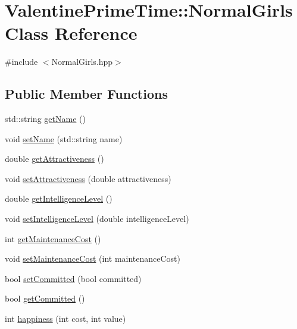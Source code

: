 \hypertarget{classValentinePrimeTime_1_1NormalGirls}{}\section{Valentine\+Prime\+Time\+:\+:Normal\+Girls Class Reference}
\label{classValentinePrimeTime_1_1NormalGirls}


{\ttfamily \#include $<$Normal\+Girls.\+hpp$>$}

\subsection*{Public Member Functions}
\begin{DoxyCompactItemize}
\item 
std\+::string \hyperlink{classValentinePrimeTime_1_1NormalGirls_a3c72692ce62377f36ec6490b85e6442a}{get\+Name} ()
\item 
void \hyperlink{classValentinePrimeTime_1_1NormalGirls_a07672e213efdcaeced5b2d7d81b157d9}{set\+Name} (std\+::string name)
\item 
double \hyperlink{classValentinePrimeTime_1_1NormalGirls_acd0f7ea11b6ef7fe554948fbc846e813}{get\+Attractiveness} ()
\item 
void \hyperlink{classValentinePrimeTime_1_1NormalGirls_ac7aa60395c4f860fc898f8aada2eb21b}{set\+Attractiveness} (double attractiveness)
\item 
double \hyperlink{classValentinePrimeTime_1_1NormalGirls_a66d615a8cecd803f3aadd245524cffd1}{get\+Intelligence\+Level} ()
\item 
void \hyperlink{classValentinePrimeTime_1_1NormalGirls_ae5e7db0b2df483b26878aaf7d9f84861}{set\+Intelligence\+Level} (double intelligence\+Level)
\item 
int \hyperlink{classValentinePrimeTime_1_1NormalGirls_a6fdbb15f962f5d18793eb028825d92e2}{get\+Maintenance\+Cost} ()
\item 
void \hyperlink{classValentinePrimeTime_1_1NormalGirls_a4f2c336e44b0c2ae30df8519a453cdfb}{set\+Maintenance\+Cost} (int maintenance\+Cost)
\item 
bool \hyperlink{classValentinePrimeTime_1_1NormalGirls_a0e867e16a629564acd034cc46e169cdb}{set\+Committed} (bool committed)
\item 
bool \hyperlink{classValentinePrimeTime_1_1NormalGirls_a6bac8021cbe196c246fe6dd0c27611a2}{get\+Committed} ()
\item 
int \hyperlink{classValentinePrimeTime_1_1NormalGirls_a846cb575b65bee2b1f6095755a1a501b}{happiness} (int cost, int value)
\end{DoxyCompactItemize}


